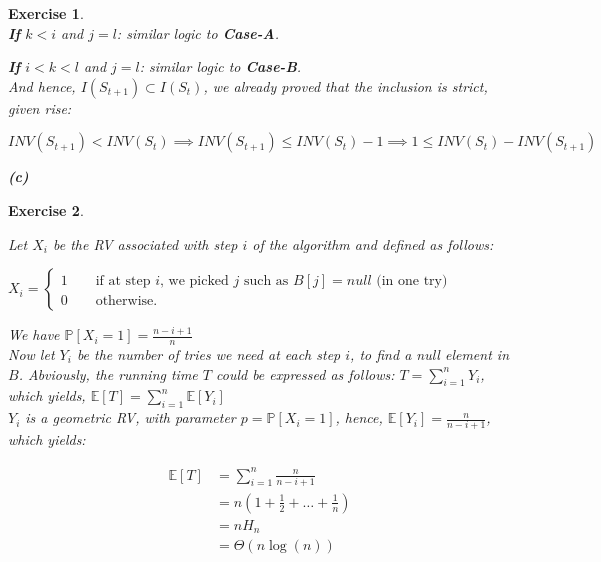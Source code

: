 \documentclass{article}
\newtheorem{exo}{Exercise}
\def\P{\mathbb{P}}
\def\E{\mathbb{E}}
\begin{document}
\begin{exo}{\ \\}
\textbf{If} $k < i$ and $j = l$: similar logic to \textbf{Case-A}. 

\textbf{If} $i<k<l$ and $j = l$: similar logic to \textbf{Case-B}.  \\

And hence, $I(S_{t+1}) \subset I(S_{t})$, we already proved that the inclusion is strict, given rise:

\[
    INV(S_{t+1}) < INV(S_{t}) \implies INV(S_{t+1}) \leq INV(S_t) - 1
    \implies 1 \leq INV(S_t) - INV(S_{t+1})
\]


\noindent
\textbf{(c)} 

\end{exo}


\begin{exo}{\ \\}

Let $X_i$ be the RV associated with step $i$ of the algorithm and defined as follows:

$X_i = 
\begin{cases}
    1 \quad \quad \text{if at step $i$, we picked $j$ such as $B[j] = null$ (in one try)} \\
    0 \quad \quad \text{otherwise.} 
\end{cases}
$

 We have $\P[X_i = 1] = \frac{n-i+1}{n}$ \\




Now let $Y_i$ be the number of tries we need at each step $i$, to find a null element in $B$. Abviously, the running time $T$ could be expressed as follows: $T = \sum^{n}_{i=1} Y_i$, which yields, $\E[T] = \sum^{n}_{i=1} \E[Y_i]$ \\

$Y_i$ is a geometric RV, with parameter $p = \P[X_i = 1]$, hence, $\E[Y_i] = \frac{n}{n-i+1} $, which yields:

\begin{align*}
    \E[T] 
    &= \sum^{n}_{i=1} \frac{n}{n-i+1} \\
    &= n(1+ \frac{1}{2} + \dots + \frac{1}{n} ) \\
    &= n H_n \\
    &= \Theta(n\log(n))
\end{align*}






\end{exo}
\end{document}
